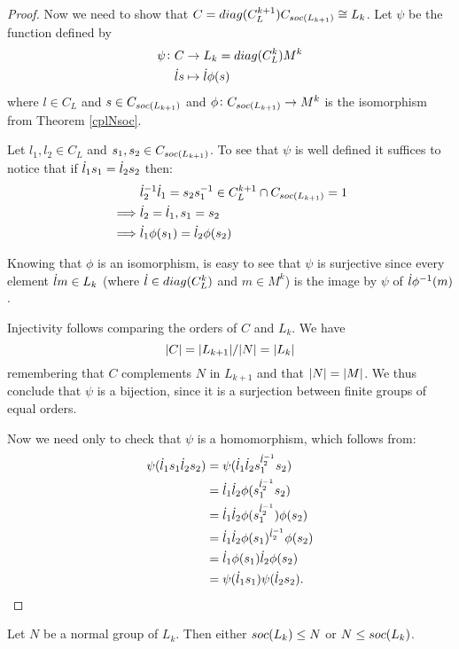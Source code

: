 \begin{proof}
    Now we need to show that $C = diag({C_L^{k+1}})C_{soc {( L_{k+1})}} \cong L_k$. Let $\psi$ be the function defined by
    \begin{align*}
        \psi \colon C & \rightarrow L_k=diag({C_L^k})M^k \\
                    \dot{l} s &\mapsto \dot{l} \phi(s)
    \end{align*}
    where $l \in C_L$ and $s \in C_{soc {(L_{k+1})}}$ and $\phi \colon C_{soc {(L_{k+1})}} \rightarrow M^k$ is the isomorphism from Theorem \ref{cplNsoc}.

    Let $l_1, l_2 \in C_L$ and $s_1, s_2 \in C_{soc {(L_{k+1})}}$.
    To see that $\psi$ is well defined it suffices to notice that if $\dot{l}_1s_1 = \dot{l}_2s_2$ then:
    \begin{align*}
        &\dot{l}_2^{-1}\dot{l}_1 = s_2s_1^{-1} \in C_L^{k+1} \cap C_{soc {(L_{k+1})}} = 1 \\
        \implies & \dot{l}_2 = \dot{l}_1, s_1 = s_2 \\
        \implies & \dot{l}_1\phi(s_1) = \dot{l}_2\phi(s_2)
    \end{align*}

    Knowing that $\phi$ is an isomorphism, is easy to see that $\psi$ is surjective since every element $\dot{l} m \in L_k$ (where $\dot{l} \in diag({C_L^k})$ and $m \in M^k$) is the image by $\psi$ of $\dot{l}\phi^{-1}(m)$.

    Injectivity follows comparing the orders of $C$ and $L_k$. We have
    $$
    | C | = | L_{k+1} | / | N | = | L_k |
    $$
    remembering that $C$ complements $N$ in $L_{k+1}$ and that $| N | = | M |$.
    We thus conclude that $\psi$ is a bijection, since it is a surjection between finite groups of equal orders.

    Now we need only to check that $\psi$ is a homomorphism, which follows from:
    \begin{align*}
        \psi(\dot{l}_1s_1\dot{l}_2s_2) &= 
    \psi(\dot{l}_1\dot{l}_2s_1^{\dot{l}_2^{-1}}s_2)\\
    &= \dot{l}_1\dot{l}_2\phi(s_1^{\dot{l}_2^{-1}}s_2)\\
    &=\dot{l}_1\dot{l}_2\phi(s_1^{\dot{l}_2^{-1}})\phi(s_2)\\
    &=\dot{l}_1\dot{l}_2\phi(s_1)^{\dot{l}_2^{-1}}\phi(s_2)\\
    &=\dot{l}_1\phi(s_1)\dot{l}_2\phi(s_2)\\
    &= \psi(\dot{l}_1s_1)\psi(\dot{l}_2s_2).
    \end{align*}
\end{proof}

\begin{theorem}
    \label{th:nsubsoc}
    Let $N$ be a normal group of $L_k$. Then either $soc {(L_k)} \le N$ or $N \le soc {(L_k)}$.
\end{theorem}

